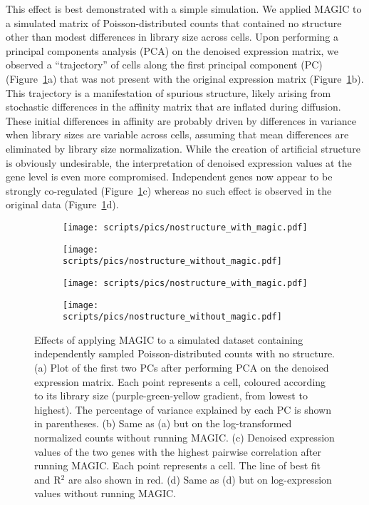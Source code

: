 \documentclass[10pt,letterpaper]{article}
\begin{document}
This effect is best demonstrated with a simple simulation.
We applied MAGIC to a simulated matrix of Poisson-distributed counts that contained no structure other than modest differences in library size across cells.
Upon performing a principal components analysis (PCA) on the denoised expression matrix, we observed a ``trajectory'' of cells along the first principal component (PC) (Figure~\ref{fig:nostructure}a) that was not present with the original expression matrix (Figure~\ref{fig:nostructure}b).
This trajectory is a manifestation of spurious structure, likely arising from stochastic differences in the affinity matrix that are inflated during diffusion.
These initial differences in affinity are probably driven by differences in variance when library sizes are variable across cells, assuming that mean differences are eliminated by library size normalization.
While the creation of artificial structure is obviously undesirable, the interpretation of denoised expression values at the gene level is even more compromised.
Independent genes now appear to be strongly co-regulated (Figure~\ref{fig:nostructure}c) whereas no such effect is observed in the original data (Figure~\ref{fig:nostructure}d).

\begin{figure}[btp]
\centering
\begin{subfigure}[b]{0.49\textwidth}
    \texttt{[image: scripts/pics/nostructure\_with\_magic.pdf]}
    \caption{}
\end{subfigure}
\begin{subfigure}[b]{0.49\textwidth}
    \texttt{[image: scripts/pics/nostructure\_without\_magic.pdf]}
    \caption{}
\end{subfigure}
\begin{subfigure}[b]{0.49\textwidth}
    \texttt{[image: scripts/pics/nostructure\_with\_magic.pdf]}
    \caption{}
\end{subfigure}
\begin{subfigure}[b]{0.49\textwidth}
    \texttt{[image: scripts/pics/nostructure\_without\_magic.pdf]}
    \caption{}
\end{subfigure}
\caption{Effects of applying MAGIC to a simulated dataset containing independently sampled Poisson-distributed counts with no structure.
(a) Plot of the first two PCs after performing PCA on the denoised expression matrix.
Each point represents a cell, coloured according to its library size (purple-green-yellow gradient, from lowest to highest).
The percentage of variance explained by each PC is shown in parentheses.
(b) Same as (a) but on the log-transformed normalized counts without running MAGIC.
(c) Denoised expression values of the two genes with the highest pairwise correlation after running MAGIC.
Each point represents a cell.
The line of best fit and R$^2$ are also shown in red.
(d) Same as (d) but on log-expression values without running MAGIC.}
\label{fig:nostructure}
\end{figure}
\end{document}
